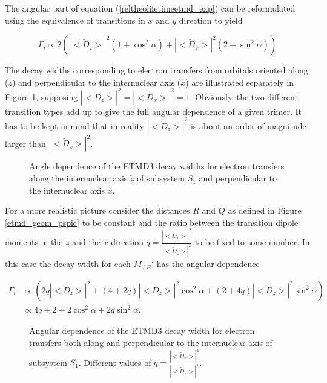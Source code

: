 The angular part of equation (\ref{reltheolifetimeetmd_exp}) can
be reformulated using
the equivalence of transitions in $\tilde{x}$ and $\tilde{y}$ direction to
yield

\begin{equation}
  \Gamma_i \propto 2 \left( |<\tilde{D}_{z}>|^2 (1+\cos^2\alpha)
                           + |<\tilde{D}_x>|^2 (2+ \sin^2\alpha) \right)
\end{equation}

The decay widths corresponding to electron transfers from orbitals
oriented along ($\tilde{z}$) and perpendicular to the internuclear axis ($\tilde{x}$)
are illustrated separately in Figure \ref{figure:etmd_angle_dir}, supposing
$|<\tilde{D}_{z}>|^2 = |<\tilde{D}_x>|^2 = 1$.
Obviously, the two different transition types add up to give the full
angular dependence of a given trimer. It has to be kept in mind that in reality
$|<\tilde{D}_{z}>|^2$ is about an order of magnitude larger than
$|<\tilde{D}_{x}>|^2$.

\begin{figure}[th]
 \centering
 
 \caption{Angle dependence of the ETMD3 decay widths for electron transfers
          along the internuclear axis $\tilde{z}$ of subsystem $S_1$ and perpendicular
          to the internuclear axis $\tilde{x}$.}
 \label{figure:etmd_angle_dir}
\end{figure}

For a more realistic picture
consider the distances $R$ and $Q$ as defined in Figure \ref{etmd_geom_pspic}
to be constant and the ratio between the transition dipole moments
in the $\tilde{z}$ and the $\tilde{x}$ direction
$q=\frac{|<\tilde{D}_x>|^2}{|<\tilde{D}_z>|^2}$ to be fixed to some number.
In this case the decay width for each $M_{AB}'$ has the angular dependence

\begin{align}
 \Gamma_i &\propto \left( 2q |<\tilde{D}_{z}>|^2 +
                  (4+2q)|<\tilde{D}_{z}>|^2 \cos^2\alpha +
                  (2+4q)|<\tilde{D}_{z}>|^2 \sin^2\alpha \right) \\
          &\propto 4q + 2 + 2 \cos^2\alpha + 2q \sin^2\alpha .
\end{align}

\begin{figure}[h]
 \centering
 
 \caption{Angular dependence of the \ac{ETMD}3 decay width for electron transfers
          both along and perpendicular to the internuclear axis of subsystem $S_1$.
          Different values of $q=\frac{|<\tilde{D}_x>|^2}{|<\tilde{D}_z>|^2}$.}
 \label{figure:etmd_angle}
\end{figure}



